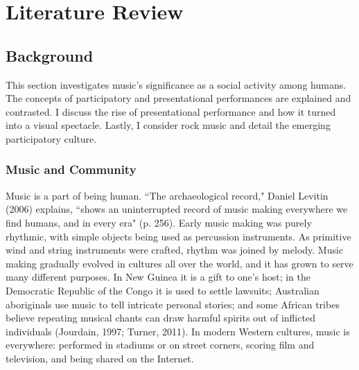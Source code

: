 \chapter{Literature Review}


\section{Background}

This section investigates music's significance as a social activity among humans. The concepts of participatory and presentational performances are explained and contrasted. I discuss  the rise of presentational performance and how it turned into a visual spectacle. Lastly, I consider rock music and detail the emerging participatory culture.

\subsection{Music and Community}

Music is a part of being human. ``The archaeological record," Daniel Levitin (2006) explains, ``shows an uninterrupted record of music making everywhere we find humans, and in every era" (p. 256). Early music making was purely rhythmic, with simple objects being used as percussion instruments. As primitive wind and string instruments were crafted, rhythm was joined by melody. Music making gradually evolved in cultures all over the world, and it has grown to serve many different purposes. In New Guinea it is a gift to one's host; in the Democratic Republic of the Congo it is used to settle lawsuits; Australian aboriginals use music to tell intricate personal stories; and some African tribes believe repeating musical chants can draw harmful spirits out of inflicted individuals (Jourdain, 1997; Turner, 2011). In modern Western cultures, music is everywhere: performed in stadiums or on street corners, scoring film and television, and being shared on the Internet.


